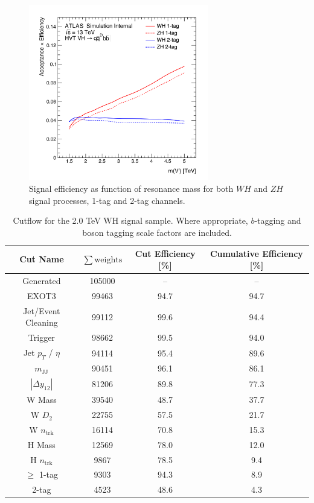 \begin{figure}[htbp!]
    \begin{center}
        \includegraphics[width=0.7\textwidth]{VHqqbb_SignalEffChannels.pdf}
    \end{center}
    \caption{Signal efficiency as function of resonance mass for both $WH$ and $ZH$ signal processes, 1-tag and 2-tag channels.}
    \label{fig:effcurve}
\end{figure}

\begin{table}[htbp!]
    \normalsize
    \centering
    \begin{tabular}{c||ccc}
        Cut Name & $\sum{\mathrm{weights}}$ & Cut Efficiency [\%] & Cumulative Efficiency [\%] \\ \hline
        Generated & 105000 & -- & --\\ \hline
        EXOT3 & 99463 & 94.7 & 94.7\\ \hline
        Jet/Event Cleaning & 99112 & 99.6 & 94.4\\ \hline
        Trigger & 98662 & 99.5 & 94.0\\ \hline
        Jet $p_{T}$ / $\eta$ & 94114 & 95.4 & 89.6\\ \hline
        $m_{\mathrm{JJ}}$ & 90451 & 96.1 & 86.1\\ \hline
        $|\Delta y_{12}|$ & 81206 & 89.8 & 77.3\\ \hline
        W Mass & 39540 & 48.7 & 37.7\\ \hline
        W $D_{2}$ & 22755 & 57.5 & 21.7\\ \hline
        W $n_{\mathrm{trk}}$ & 16114 & 70.8 & 15.3\\ \hline
        H Mass & 12569 & 78.0 & 12.0\\ \hline
        H $n_{\mathrm{trk}}$ & 9867 & 78.5 & 9.4\\ \hline
        $\geq$ 1-tag & 9303 & 94.3 & 8.9\\ \hline
        2-tag & 4523 & 48.6 & 4.3\\ \hline
    \end{tabular}
    \caption{Cutflow for the 2.0 TeV WH signal sample. Where appropriate, $b$-tagging and boson tagging scale factors are included. }
    \label{tab:wh_2TeV_cutflow}
\end{table}

